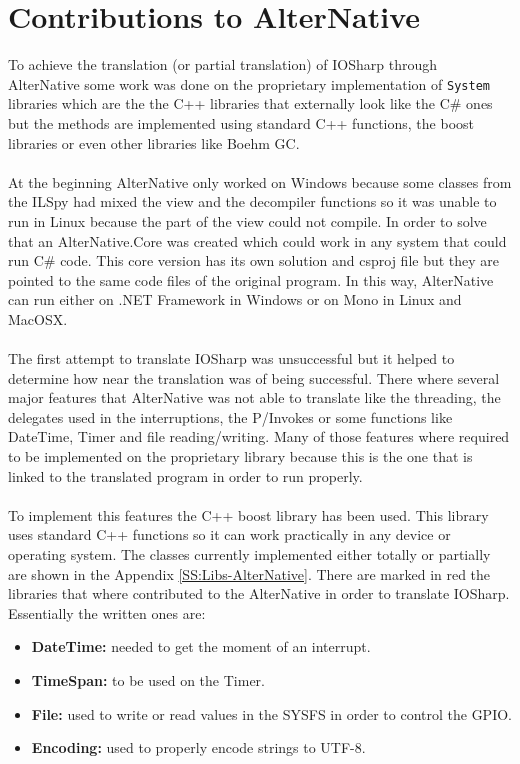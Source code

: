 \section{Contributions to AlterNative}\label{AN-WorkDone}
To achieve the translation (or partial translation) of IOSharp through AlterNative some work was done on the proprietary implementation of \verb!System! libraries which are the the C++ libraries that externally look like the C\# ones but the methods are implemented using standard C++ functions, the boost libraries or even other libraries like Boehm GC.
\\
\\
At the beginning AlterNative only worked on Windows because some classes from the ILSpy had mixed the view and the decompiler functions so it was unable to run in Linux because the part of the view could not compile. In order to solve that an AlterNative.Core was created which could work in any system that could run C\# code. This core version has its own solution and csproj file but they are pointed to the same code files of the original program. In this way, AlterNative can run either on .NET Framework in Windows or on Mono in Linux and MacOSX.
\\
\\
The first attempt to translate IOSharp was unsuccessful but it helped to determine how near the translation was of being successful. There where several major features that AlterNative was not able to translate like the threading, the delegates used in the interruptions, the P/Invokes or some functions like DateTime, Timer and file reading/writing. Many of those features where required to be implemented on the proprietary library because this is the one that is linked to the translated program in order to run properly.
\\
\\
To implement this features the C++ boost library has been used. This library uses standard C++ functions so it can work practically in any device or operating system. The classes currently implemented either totally or partially are shown in the Appendix \ref{SS:Libs-AlterNative}. There are marked in red the libraries that where contributed to the AlterNative in order to translate IOSharp. Essentially the written ones are:
\begin{itemize}
\item \textbf{DateTime:} needed to get the moment of an interrupt.
\item \textbf{TimeSpan:} to be used on the Timer.
\item \textbf{File:} used to write or read values in the SYSFS in order to control the GPIO.
\item \textbf{Encoding:} used to properly encode strings to UTF-8.
\end{itemize}

